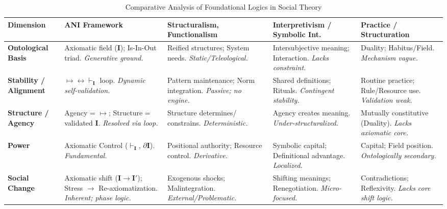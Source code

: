 \documentclass{article}
\newcommand{\Isness}{\mathbf{I}}            %
\newcommand{\enactment}{\ensuremath{\mapsto}} %
\newcommand{\validates}[1]{\ensuremath{\vdash_{#1}}} %
\newcommand{\boundary}[1]{\ensuremath{\partial #1}} %
\begin{document}
\begin{table}[ht!] 
    \centering
    \caption{Comparative Analysis of Foundational Logics in Social Theory}
    \label{tab:comparison}
    \small 
    \begin{tabular}{@{}l >{\raggedright\arraybackslash}p{2.8cm} >{\raggedright\arraybackslash}p{2.5cm} >{\raggedright\arraybackslash}p{2.5cm} >{\raggedright\arraybackslash}p{2.5cm} @{}} 
    \toprule
    \textbf{Dimension} & \textbf{ANI Framework} & \textbf{Structuralism, Functionalism} & \textbf{Interpretivism / Symbolic Int.} & \textbf{Practice / Structuration} \\
    \midrule
    \textbf{Ontological Basis} 
      & Axiomatic field ($\Isness$); Is-In-Out triad. \textit{Generative ground.} 
      & Reified structures; System needs. \textit{Static/Teleological.} 
      & Intersubjective meaning; Interaction. \textit{Lacks constraint.} 
      & Duality; Habitus/Field. \textit{Mechanism vague.} \\
    \addlinespace 
    \textbf{Stability / Alignment} 
      & $\enactment \leftrightarrow \validates{\Isness}$ loop. \textit{Dynamic self-validation.} 
      & Pattern maintenance; Norm integration. \textit{Passive; no engine.} 
      & Shared definitions; Rituals. \textit{Contingent stability.} 
      & Routine practice; Rule/Resource use. \textit{Validation weak.} \\
    \addlinespace
    \textbf{Structure / Agency} 
      & Agency = $\enactment$; Structure = validated $\Isness$. \textit{Resolved via loop.} 
      & Structure determines/ constrains. \textit{Deterministic.} 
      & Agency creates meaning. \textit{Under-structuralized.} 
      & Mutually constitutive (Duality). \textit{Lacks axiomatic core.} \\
    \addlinespace
    \textbf{Power} 
      & Axiomatic Control ($\validates{\Isness}$, $\boundary{\Isness}$). \textit{Fundamental.} 
      & Positional authority; Resource control. \textit{Derivative.} 
      & Symbolic capital; Definitional advantage. \textit{Localized.} 
      & Capital; Field position. \textit{Ontologically secondary.} \\
    \addlinespace
    \textbf{Social Change} 
      & Axiomatic shift ($\Isness \rightarrow \Isness'$); Stress $\rightarrow$ Re-axiomatization. \textit{Inherent; phase logic.} 
      & Exogenous shocks; Malintegration. \textit{External/Problematic.} 
      & Shifting meanings; Renegotiation. \textit{Micro-focused.} 
      & Contradictions; Reflexivity. \textit{Lacks core shift logic.} \\
    \bottomrule
    \end{tabular}
    \end{table}
\end{document}
